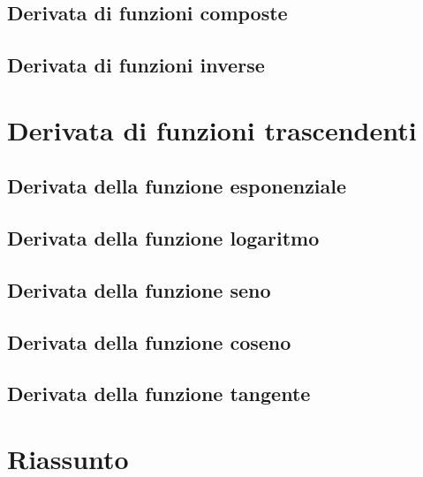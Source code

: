 \subsection{Derivata di funzioni composte}
\label{subsec:differenziazione_derivatacomposte}

\subsection{Derivata di funzioni inverse}
\label{subsec:differenziazione_derivatainverse}

\section{Derivata di funzioni trascendenti}
\label{sec:differenziazione_trascendenti}

\subsection{Derivata della funzione esponenziale}
\label{subsec:differenziazione_derivatafesponenziale}

\subsection{Derivata della funzione logaritmo}
\label{subsec:differenziazione_derivataflogaritmo}

\subsection{Derivata della funzione seno}
\label{subsec:differenziazione_derivatafseno}

\subsection{Derivata della funzione coseno}
\label{subsec:differenziazione_derivatafcoseno}

\subsection{Derivata della funzione tangente}
\label{subsec:differenziazione_derivataftangente}

\section{Riassunto}
\label{sec:differenziazione_sunto}

